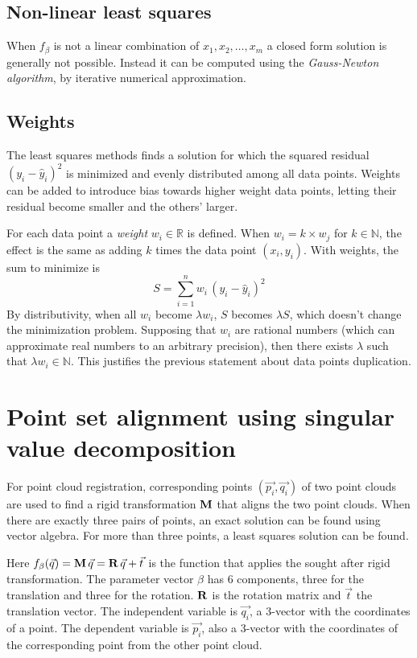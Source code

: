 \subsection{Non-linear least squares}
When $f_{\beta}$ is not a linear combination of $x_1, x_2, \dots, x_m$ a closed form solution is generally not possible. Instead it can be computed using the \emph{Gauss-Newton algorithm}, by iterative numerical approximation.

\subsection{Weights}
The least squares methods finds a solution for which the squared residual $(y_i - \hat{y}_i)^2$ is minimized and evenly distributed among all data points. Weights can be added to introduce bias towards higher weight data points, letting their residual become smaller and the others' larger.

For each data point a \emph{weight} $w_i \in \mathbb{R}$ is defined. When $w_i = k \times w_j$ for $k \in \mathds{N}$, the effect is the same as adding $k$ times the data point $(x_i, y_i)$. With weights, the sum to minimize is
\begin{equation}
S = \sum_{i=1}^{n} w_i \, (y_i - \hat{y}_i)^2
\end{equation}
By distributivity, when all $w_i$ become $\lambda w_i$, $S$ becomes $\lambda S$, which doesn't change the minimization problem. Supposing that $w_i$ are rational numbers (which can approximate real numbers to an arbitrary precision), then there exists $\lambda$ such that $\lambda w_i \in \mathbb{N}$. This justifies the previous statement about data points duplication. 

\section{Point set alignment using singular value decomposition} \label{sec:lsq_align}
For point cloud registration, corresponding points $(\vec{p_i}, \vec{q_i})$ of two point clouds are used to find a rigid transformation $\mathbf{M}$ that aligns the two point clouds. When there are exactly three pairs of points, an exact solution can be found using vector algebra. \cite{Horn1986} For more than three points, a least squares solution can be found.

Here $f_{\beta}(\vec{q}) = \mathbf{M} \, \vec{q} = \mathbf{R} \, \vec{q} + \vec{t}$ is the function that applies the sought after rigid transformation. The parameter vector $\beta$ has 6 components, three for the translation and three for the rotation. $\mathbf{R}$ is the rotation matrix and $\vec{t}$ the translation vector. The independent variable is $\vec{q_i}$, a 3-vector with the coordinates of a point. The dependent variable is $\vec{p_i}$, also a 3-vector with the coordinates of the corresponding point from the other point cloud.

